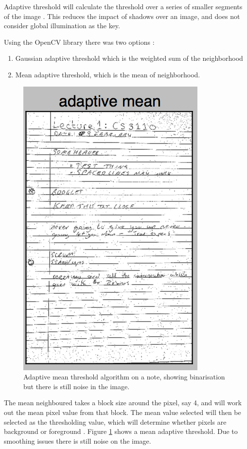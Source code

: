 Adaptive threshold will calculate the threshold over a series of smaller segments of the image \cite{citeulike:14021401}. This reduces the impact of shadows over an image, and does not consider global illumination as the key.

Using the OpenCV library there was two options \cite{citeulike:1402140}:
\begin{enumerate}
  \item Gaussian adaptive threshold which is the weighted sum of the neighborhood
  \item Mean adaptive threshold, which is the mean of neighborhood.
\end{enumerate}

\begin{figure}[H]
  \centering
  \includegraphics{images/adaptive_mean}
  \caption{Adaptive mean threshold algorithm on a note, showing binarisation but there is still noise in the image.}
  \label{fig:adaptive_mean}
\end{figure}

The mean neighboured takes a block size around the pixel, say 4, and will work out the mean pixel value from that block. The mean value selected will then be selected as the thresholding value, which will determine whether pixels are background or foreground \cite{citeulike:14021401}. Figure \ref{fig:adaptive_mean} shows a mean adaptive threshold. Due to smoothing issues there is still noise on the image.

